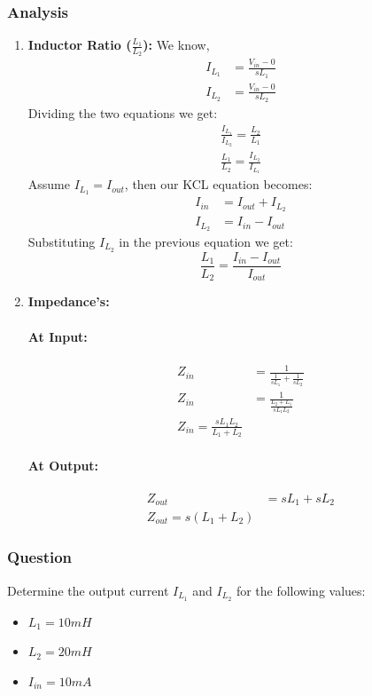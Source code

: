 \subsubsection{Analysis}
\begin{enumerate}
  \item \textbf{Inductor Ratio (\(\frac{L_1}{L_2}\)):}
    We know,
    \begin{align*}
      I_{L_1} &= \frac{V_{in} - 0}{sL_1} \\
      I_{L_2} &= \frac{V_{in} - 0}{sL_2}
    \end{align*}
    Dividing the two equations we get:
    \begin{align*}
      \frac{I_{L_1}}{I_{L_2}} = \frac{L_2}{L_1} \\
      \frac{L_1}{L_2} = \frac{I_{L_2}}{I_{L_1}}
    \end{align*}
    Assume \(I_{L_1} = I_{out}\), then our KCL equation
    becomes:
    \begin{align*}
      I_{in} &= I_{out} + I_{L_2} \\
      I_{L_2} &= I_{in} - I_{out}
    \end{align*}
    Substituting \(I_{L_2}\) in the previous equation
    we get:
    \[
      \frac{L_1}{L_2} = \frac{I_{in} - I_{out}}{I_{out}}
    \]
  \item \textbf{Impedance's:}
    \paragraph{At Input:}
      \begin{align*}
        Z_{in} &= \frac{1}{\frac{1}{sL_1} + \frac{1}{sL_2}} \\
        Z_{in} &= \frac{1}{\frac{L_2 + L_1}{sL_1 L_2}} \\
        Z_{in} = \frac{sL_1 L_2}{L_1 + L_2}
      \end{align*}
    \paragraph{At Output:}
      \begin{align*}
        Z_{out} &= sL_1 + sL_2 \\
        Z_{out} = s(L_1 + L_2)
      \end{align*}
\end{enumerate}

\subsubsection{Question}
Determine the output current \(I_{L_1}\) and \(I_{L_2}\) for the following values:
\begin{itemize}
  \item \(L_1 = 10mH\)
  \item \(L_2 = 20mH\)
  \item \(I_{in} = 10mA\)
\end{itemize}
